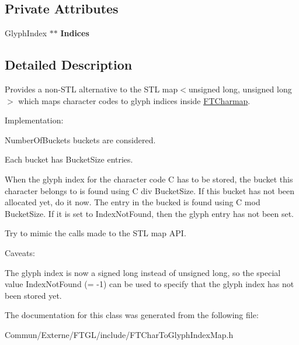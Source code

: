\subsection*{Private Attributes}
\begin{DoxyCompactItemize}
\item 
Glyph\+Index $\ast$$\ast$ {\bfseries Indices}\hypertarget{class_f_t_char_to_glyph_index_map_a097155ccaa63e6874b1d85a1378ccd50}{}\label{class_f_t_char_to_glyph_index_map_a097155ccaa63e6874b1d85a1378ccd50}

\end{DoxyCompactItemize}


\subsection{Detailed Description}
Provides a non-\/\+S\+TL alternative to the S\+TL map$<$unsigned long, unsigned long$>$ which maps character codes to glyph indices inside \hyperlink{class_f_t_charmap}{F\+T\+Charmap}.

Implementation\+:
\begin{DoxyItemize}
\item Number\+Of\+Buckets buckets are considered.
\item Each bucket has Bucket\+Size entries.
\item When the glyph index for the character code C has to be stored, the bucket this character belongs to is found using \textquotesingle{}C div Bucket\+Size\textquotesingle{}. If this bucket has not been allocated yet, do it now. The entry in the bucked is found using \textquotesingle{}C mod Bucket\+Size\textquotesingle{}. If it is set to Index\+Not\+Found, then the glyph entry has not been set.
\item Try to mimic the calls made to the S\+TL map A\+PI.
\end{DoxyItemize}

Caveats\+:
\begin{DoxyItemize}
\item The glyph index is now a signed long instead of unsigned long, so the special value Index\+Not\+Found (= -\/1) can be used to specify that the glyph index has not been stored yet. 
\end{DoxyItemize}

The documentation for this class was generated from the following file\+:\begin{DoxyCompactItemize}
\item 
Commun/\+Externe/\+F\+T\+G\+L/include/F\+T\+Char\+To\+Glyph\+Index\+Map.\+h\end{DoxyCompactItemize}

